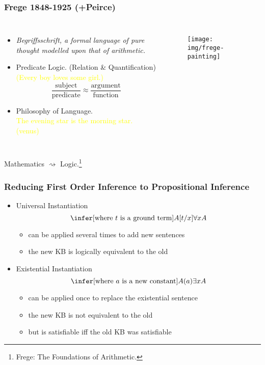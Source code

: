 \documentclass[UTF8,11pt,colorlinks,compress,openany]{beamer}%
\begin{document}
\begin{frame}\frametitle{Frege 1848-1925 (+Peirce)}
	\begin{columns}
			\begin{itemize}
				\item \emph{Begriffsschrift, a formal language of pure thought modelled upon that of arithmetic.}
				\item Predicate Logic. (Relation \& Quantification)\\
				\textcolor{yellow}{(Every boy loves some girl.)}
				\[\dfrac{\text{subject}}{\text{predicate}} \approx \dfrac{\text{argument}}{\text{function}}\]
				\item Philosophy of Language.\\
				\textcolor{yellow}{The evening star is the morning star. (venus)}
			\end{itemize}
			\begin{figure}
				\texttt{[image: img/frege-painting]}
			\end{figure}
	\end{columns}
	\centerline{\textcolor{red}{} Mathematics $\rightsquigarrow$ Logic.\footnote{\tiny Frege: The Foundations of Arithmetic.}}
\end{frame}

\begin{frame}\frametitle{Reducing First Order Inference to Propositional Inference}
\begin{itemize}
	\item Universal Instantiation
	\[\infer[\text{where $t$ is a ground term}]{A[t/x]}{\forall xA}\]
	\begin{itemize}
		\item can be applied several times to add new sentences
		\item the new KB is logically equivalent to the old
	\end{itemize}
	\item Existential Instantiation
	\[\infer[\text{where $a$ is a new constant}]{A(a)}{\exists xA}\]
	\begin{itemize}
		\item can be applied once to replace the existential sentence
		\item the new KB is not equivalent to the old
		\item but is satisfiable iff the old KB was satisfiable
	\end{itemize}
\end{itemize}
\end{frame}
\end{document}
